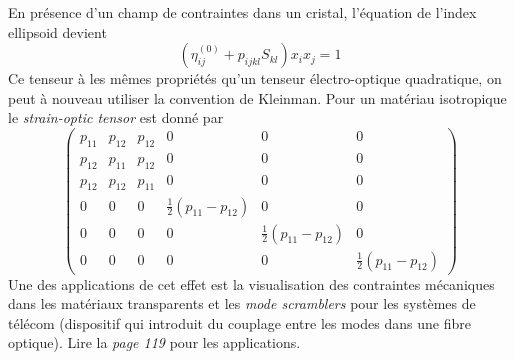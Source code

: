 En présence d'un champ de contraintes dans un cristal, l'équation de l'index ellipsoid devient
\begin{equation}
\left(\eta_{ij}^{(0)}+p_{ijkl}S_{kl}\right) x_ix_j=1
\end{equation}
Ce tenseur à les mêmes propriétés qu'un tenseur électro-optique quadratique, on peut à nouveau utiliser la 
convention de Kleinman. Pour un matériau isotropique le \textit{strain-optic tensor} est donné par
\begin{equation}
\left(\begin{array}{cccccc}
p_{11}&p_{12}&p_{12}&0&0&0\\
p_{12}&p_{11}&p_{12}&0&0&0\\
p_{12}&p_{12}&p_{11}&0&0&0\\
0&0&0&\frac{1}{2}(p_{11}-p_{12}) &0&0\\
0&0&0&0&\frac{1}{2}(p_{11}-p_{12})&0\\
0&0&0&0&0&\frac{1}{2}(p_{11}-p_{12})
\end{array}\right)
\label{eq:6.91}
\end{equation}
Une des applications de cet effet est la visualisation des contraintes mécaniques dans les matériaux 
transparents et les \textit{mode scramblers} pour les systèmes de télécom (dispositif qui introduit du couplage 
entre les modes dans une fibre optique). Lire la \textit{page 119} pour les applications. 


